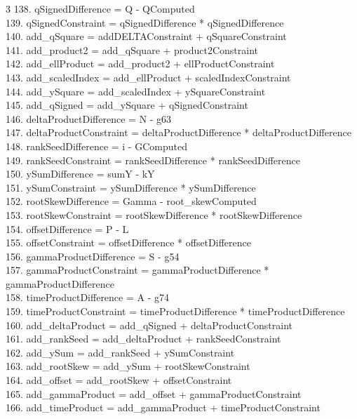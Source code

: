 \documentclass[10pt]{article}
\begin{document}
\begin{multicols}{3}
138. qSignedDifference = Q - QComputed\\
139. qSignedConstraint = qSignedDifference * qSignedDifference\\
140. add\_qSquare = addDELTAConstraint + qSquareConstraint\\
141. add\_product2 = add\_qSquare + product2Constraint\\
142. add\_ellProduct = add\_product2 + ellProductConstraint\\
143. add\_scaledIndex = add\_ellProduct + scaledIndexConstraint\\
144. add\_ySquare = add\_scaledIndex + ySquareConstraint\\
145. add\_qSigned = add\_ySquare + qSignedConstraint\\
146. deltaProductDifference = N - g63\\
147. deltaProductConstraint = deltaProductDifference * deltaProductDifference\\
148. rankSeedDifference = i - GComputed\\
149. rankSeedConstraint = rankSeedDifference * rankSeedDifference\\
150. ySumDifference = sumY - kY\\
151. ySumConstraint = ySumDifference * ySumDifference\\
152. rootSkewDifference = Gamma - root\_skewComputed\\
153. rootSkewConstraint = rootSkewDifference * rootSkewDifference\\
154. offsetDifference = P - L\\
155. offsetConstraint = offsetDifference * offsetDifference\\
156. gammaProductDifference = S - g54\\
157. gammaProductConstraint = gammaProductDifference * gammaProductDifference\\
158. timeProductDifference = A - g74\\
159. timeProductConstraint = timeProductDifference * timeProductDifference\\
160. add\_deltaProduct = add\_qSigned + deltaProductConstraint\\
161. add\_rankSeed = add\_deltaProduct + rankSeedConstraint\\
162. add\_ySum = add\_rankSeed + ySumConstraint\\
163. add\_rootSkew = add\_ySum + rootSkewConstraint\\
164. add\_offset = add\_rootSkew + offsetConstraint\\
165. add\_gammaProduct = add\_offset + gammaProductConstraint\\
166. add\_timeProduct = add\_gammaProduct + timeProductConstraint\\
\end{multicols}
\end{document}
